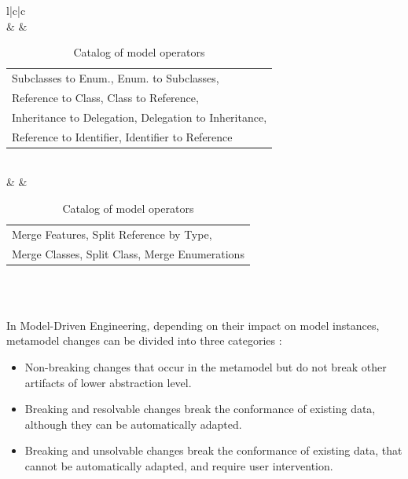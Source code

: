 \begin{table}[H]
{{\begin{tabular}{l|c|c}
  			\\   
  			&  
  			&  \begin{tabular}[c]{@{}l@{}} Subclasses to Enum., Enum. to Subclasses,\\ Reference to Class, Class to Reference, \\Inheritance to Delegation, Delegation to Inheritance,\\ Reference to Identifier, Identifier to Reference \end{tabular}
  			\\   
  			&  
  			&  \begin{tabular}[c]{@{}l@{}} Merge Features, Split Reference by Type,\\ Merge Classes, Split Class, Merge Enumerations\\\end{tabular}
  			\\
  			\\
  			\bottomrule
  			
  		\end{tabular}
  	}
  }
  \caption{Catalog of model operators} 
  \label{table:changesCatalog}
  \end{table}
  In Model-Driven Engineering, depending on their impact on model instances, metamodel changes can be divided into three categories \cite{gruschko2007towards}:
 \begin{itemize}
 	
 	\item	Non-breaking changes that occur in the metamodel but do not break other artifacts of lower abstraction level.%
 	\item Breaking and resolvable changes break the conformance of existing data, although they can be automatically adapted.
 	\item Breaking and unsolvable changes break the conformance of existing data, that cannot be automatically adapted, and require user intervention.
 \end{itemize}
 
